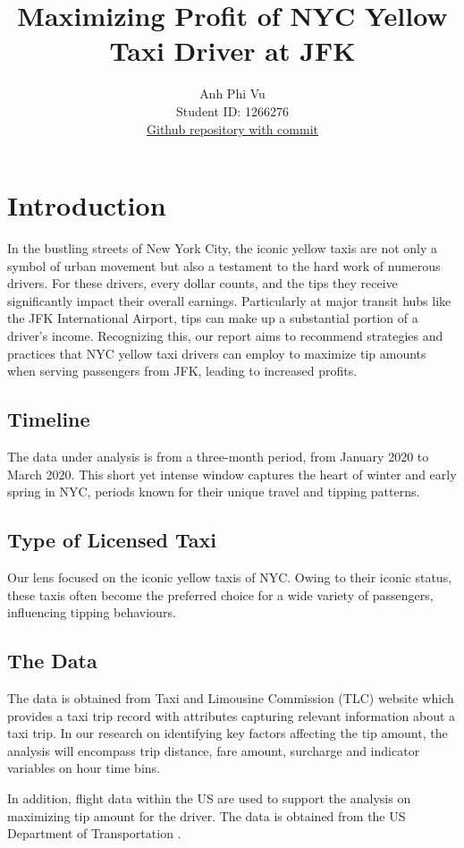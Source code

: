 \documentclass[11pt]{article}
\title{\textbf{Maximizing Profit of NYC Yellow Taxi Driver at JFK}}
\author{
Anh Phi Vu \\
Student ID: 1266276 \\
\href{https://github.com/MAST30034-Applied-Data-Science/mast30034-project-1-anhphivu}{Github repository with commit}
}
\begin{document}
\maketitle

\section{Introduction}
In the bustling streets of New York City, the iconic yellow taxis are not only a symbol of urban movement but also a testament to the hard work of numerous drivers. For these drivers, every dollar counts, and the tips they receive significantly impact their overall earnings. Particularly at major transit hubs like the JFK International Airport, tips can make up a substantial portion of a driver's income. Recognizing this, our report aims to recommend strategies and practices that NYC yellow taxi drivers can employ to maximize tip amounts when serving passengers from JFK, leading to increased profits.

\subsection{Timeline}
The data under analysis is from a three-month period, from January 2020 to March 2020. This short yet intense window captures the heart of winter and early spring in NYC, periods known for their unique travel and tipping patterns.

\subsection{Type of Licensed Taxi}
Our lens focused on the iconic yellow taxis of NYC. Owing to their iconic status, these taxis often become the preferred choice for a wide variety of passengers, influencing tipping behaviours.

\subsection{The Data}
The data is obtained from Taxi and Limousine Commission (TLC) website \cite{taxidata} which provides a taxi trip record with attributes capturing relevant information about a taxi trip. In our research on identifying key factors affecting the tip amount, the analysis will encompass trip distance, fare amount, surcharge and indicator variables on hour time bins.

In addition, flight data within the US are used to support the analysis on maximizing tip amount for the driver. The data is obtained from the US Department of Transportation \cite{flightdata}.
\end{document}

